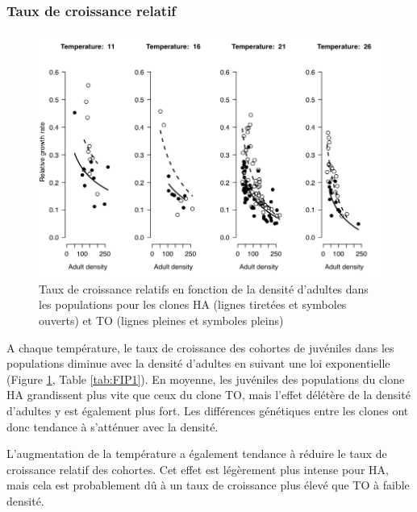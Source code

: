 \subsubsection{Taux de croissance relatif}

\begin{figure}[!ht]
\begin{center}
\includegraphics[width=\textwidth]{1_CorpsDeThese/Resumes/Fig/FIP04}
\caption[Taux de croissance
relatifs]{Taux de croissance relatifs en fonction de la densité d'adultes dans
les populations pour les clones HA (lignes tiretées et symboles ouverts) et TO
(lignes pleines et symboles pleins)}
\label{fig:FIP4}
\end{center}
\end{figure}

A chaque température, le taux de croissance des cohortes de juvéniles dans les
populations diminue avec la densité d'adultes en suivant une loi exponentielle
(Figure \ref{fig:FIP4}, Table \ref{tab:FIP1}). En moyenne, les juvéniles des
populations du clone HA grandissent plus vite que ceux du clone TO, mais l'effet
délétère de la densité d'adultes y est également plus fort. Les différences
génétiques entre les clones ont donc tendance à s'atténuer avec la densité. 

L'augmentation de la température a également tendance à réduire le taux de
croissance relatif des cohortes. Cet effet est légèrement plus intense pour HA,
mais cela est probablement dû à un taux de croissance plus élevé que TO à
faible densité. 

